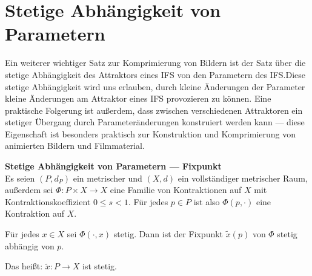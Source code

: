 \documentclass[afourpaper]{tufte-handout}
\begin{document}
\section{Stetige Abhängigkeit von Parametern}

Ein weiterer wichtiger Satz zur Komprimierung von Bildern ist der Satz über die stetige Abhängigkeit des Attraktors eines IFS von den Parametern des IFS.\@ Diese stetige Abhängigkeit wird uns erlauben, durch kleine Änderungen der Parameter kleine Änderungen am Attraktor eines IFS provozieren zu können. Eine praktische Folgerung ist außerdem, dass zwischen verschiedenen Attraktoren ein stetiger Übergang durch Parameteränderungen konstruiert werden kann --- diese Eigenschaft ist besonders praktisch zur Konstruktion und Komprimierung von animierten Bildern und Filmmaterial.

\begin{theorembox}
  \textbf{Stetige Abhängigkeit von Parametern --- Fixpunkt} \\
  \vspace{1mm}
  Es seien \( (P, d_P) \) ein metrischer und \( (X,d) \) ein vollständiger metrischer Raum, außerdem sei \( \Phi : P \times X \to X \) eine Familie von Kontraktionen auf \( X \) mit Kontraktionskoeffizient \( 0 \leq s < 1 \). Für jedes \( p \in P \) ist also \( \Phi(p, \cdot) \) eine Kontraktion auf \( X \).

  \vspace{1em}
  Für jedes \( x \in X \) sei \( \Phi(\cdot, x) \) stetig. Dann ist der Fixpunkt \( \widetilde{x}(p) \) von \( \Phi \) stetig abhängig von \( p \).

  \vspace{1em}
  Das heißt: \( \widetilde{x} : P \to X \) ist stetig.
\end{theorembox}
\end{document}
